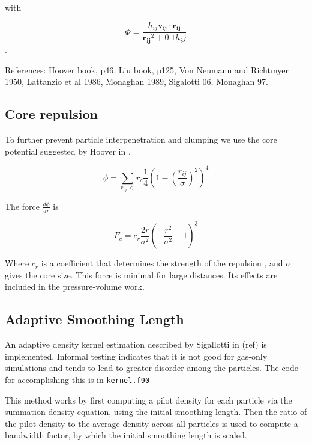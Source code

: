with 

\[
\Phi = \frac{ h_{ij} \mathbold{v_{ij}} \cdot \mathbold{r_{ij}} } { \mathbold{r_{ij}}^2 + 0.1 h_ij } 
\].

References: Hoover book, p46, Liu book, p125, Von Neumann and Richtmyer 1950,
Lattanzio et al 1986, Monaghan 1989, Sigalotti 06, Monaghan 97.

\subsection{Core repulsion}

To further prevent particle interpenetration and clumping we use the core
potential suggested by Hoover in \cite{hoover_smooth_2006}.

\begin{equation}
\label{core_potential} 
\phi = \sum_{r_{ij} < } r_{c}\frac{1}{4} 
\left( 1 - \left( \frac{r_{ij}}{\sigma} \right)^2 \right)^4
\end{equation}

The force $\frac{d \phi}{dr}$ is

\begin{equation}
 \label{core_repulsion}
F_{c} = c_{r} \frac{2r}{\sigma^2} \left( - \frac{r^2}{\sigma^2} + 1 \right)^{3}
\end{equation}

Where $c_{r}$ is a coefficient that determines the strength of the repulsion ,
and $\sigma$ gives the core size. This force is minimal for large distances. Its
effects are included in the pressure-volume work.

\subsection{Adaptive Smoothing Length}
An adaptive density kernel estimation described by Sigallotti in (ref) is
implemented.  Informal testing indicates that it is not good for gas-only
simulations and tends to lead to greater disorder among the particles. The code
for accomplishing this is in \texttt{kernel.f90}

This method works by first computing a pilot density for each particle via the
summation density equation, using the initial smoothing length. Then the ratio
of the pilot density to the average density across all particles is used to
compute a bandwidth factor, by which the initial smoothing length is scaled.

